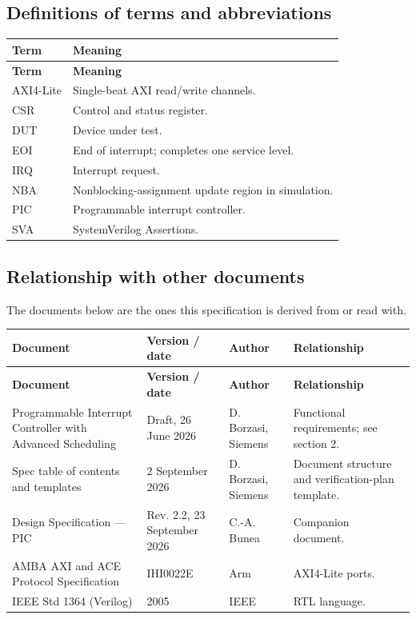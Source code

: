 \documentclass[11pt]{article}
\begin{document}
\subsection{Definitions of terms and abbreviations}
{\small
\begin{longtable}{@{}L{0.2300\dimexpr\linewidth-12pt\relax}L{0.7700\dimexpr\linewidth-12pt\relax}@{}}
\toprule
\textbf{Term} & \textbf{Meaning} \\ \midrule
\endfirsthead
\toprule
\textbf{Term} & \textbf{Meaning} \\ \midrule
\endhead
AXI4-Lite & Single-beat AXI read/write channels. \\ \addlinespace[3pt]
CSR & Control and status register. \\ \addlinespace[3pt]
DUT & Device under test. \\ \addlinespace[3pt]
EOI & End of interrupt; completes one service level. \\ \addlinespace[3pt]
IRQ & Interrupt request. \\ \addlinespace[3pt]
NBA & Nonblocking-assignment update region in simulation. \\ \addlinespace[3pt]
PIC & Programmable interrupt controller. \\ \addlinespace[3pt]
SVA & SystemVerilog Assertions. \\*
\bottomrule\end{longtable}}

\subsection{Relationship with other documents}
\noindent The documents below are the ones this specification is derived from or read with.\par\medskip
{\small
\begin{longtable}{@{}L{0.3400\dimexpr\linewidth-36pt\relax}L{0.2200\dimexpr\linewidth-36pt\relax}L{0.1800\dimexpr\linewidth-36pt\relax}L{0.2600\dimexpr\linewidth-36pt\relax}@{}}
\toprule
\textbf{Document} & \textbf{Version / date} & \textbf{Author} & \textbf{Relationship} \\ \midrule
\endfirsthead
\toprule
\textbf{Document} & \textbf{Version / date} & \textbf{Author} & \textbf{Relationship} \\ \midrule
\endhead
Programmable Interrupt Controller with Advanced Scheduling & Draft, 26 June 2026 & D. Borzasi, Siemens & Functional requirements; see section 2. \\ \addlinespace[3pt]
Spec table of contents and templates & 2 September 2026 & D. Borzasi, Siemens & Document structure and verification-plan template. \\ \addlinespace[3pt]
Design Specification — PIC & Rev. 2.2, 23 September 2026 & C.-A. Bunea & Companion document. \\ \addlinespace[3pt]
AMBA AXI and ACE Protocol Specification & IHI0022E & Arm & AXI4-Lite ports. \\ \addlinespace[3pt]
IEEE Std 1364 (Verilog) & 2005 & IEEE & RTL language. \\*
\bottomrule\end{longtable}}
\end{document}
